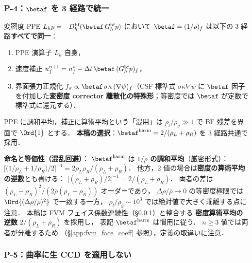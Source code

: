 \subsubsection{P-4：$\betaf$ を 3 経路で統一}
\label{sec:bf_p4_beta}

変密度 PPE $L_h p = -D_h^\text{bf}(\betaf\,G_h^\text{bf} p)$ において
$\betaf = (1/\rho)_f$ は以下の 3 経路\textbf{すべてで同一}：
\begin{enumerate}[leftmargin=2em,noitemsep]
  \item PPE 演算子 $L_h$ 自身，
  \item 速度補正 $u_f^{n+1} = u_f^* - \Delta t\,\betaf\,(G_h^\text{bf} p)_f$，
  \item 界面張力正規化 $f_\sigma \propto \betaf\,\sigma\kappa\,(\nabla\psi)_f$（CSF
        標準式 $\sigma\kappa\nabla\psi$ に $\betaf$ 因子を付加した\textbf{変密度
        corrector 離散化の特殊形}；等密度では $\betaf$ が定数で標準式に還元する）．
\end{enumerate}
PPE に調和平均，補正に算術平均という「混用」は
$\rho_l/\rho_g \gg 1$ で BF 残差を界面で $\Ord{1}$ とする．
\textbf{本稿の選択}：$\betaf^\text{harm}=2/(\rho_L+\rho_R)$ を 3 経路共通で採用．

\smallskip\noindent\textbf{命名と等価性（混乱回避）}：
$\betaf^\text{harm}$ は \textbf{$1/\rho$ の調和平均}（厳密形式）：
$\bigl[\bigl(1/\rho_L+1/\rho_R\bigr)/2\bigr]^{-1}=2\rho_L\rho_R/(\rho_L+\rho_R)$．
他方，2 値の場合は\textbf{密度の算術平均の逆数}とも書ける：
$\bigl[(\rho_L+\rho_R)/2\bigr]^{-1}=2/(\rho_L+\rho_R)$．
両者の差は $(\rho_L-\rho_R)^2/(2\bar\rho(\rho_L+\rho_R))$ オーダーであり，
$\Delta\rho/\bar\rho \to 0$ の等密度極限では $\Ord{(\Delta\rho/\bar\rho)^2}$ で一致する一方，
$\rho_l/\rho_g\sim 10^3$ では絶対値で大きく乖離する点に注意．
本稿は FVM フェイス係数連続性（§\ref{sec:bf_p4_beta}）と整合する
\textbf{密度算術平均の逆数} $2/(\rho_L+\rho_R)$ を採用し，
表記 $\betaf^\text{harm}$ は慣用に従う．
$n\ge 3$ 値では両者が分離するため
（§\ref{app:fvm_face_coeff} 参照），定義の取違いに注意．

\subsubsection{P-5：曲率に生 CCD を適用しない}
\label{sec:bf_p5_curvature}

